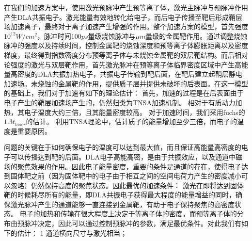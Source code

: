 在我们的加速方案中，使用激光预脉冲产生预等离子体，激光主脉冲与预脉冲作用产生DLA共振电子。激光能量有效地转化给电子，而后电子传播至靶后形成鞘层场加速离子，最终对于离子加速产生增强的作用。整个加速方案的模型，首先强度$10^{12}W/cm^2$，脉冲时间$100ps$量级烧蚀脉冲与$\mu m$量级的金属靶作用。通过调整烧蚀脉冲的强度以及持续时间，控制金属靶的烧蚀深度和预等离子体膨胀距离以及密度梯度，最终得到指数密度分布预等离子体与未烧蚀金属靶的双层靶结构。而后相对论强度的激光与双层靶作用，首先激光脉冲在预等离子体临界密度区域中产生高能量高密度的DLA共振加热电子，共振电子传输到靶后面，在靶后建立起鞘层静电加速场。未烧蚀的金属靶的作用，提供质子层并提供未破坏的后表面。在这一模型的基础上，我们对于加速有如下的理论估计：
首先，加速的过程是在后表面由于电子产生的鞘层加速场产生的，仍然归类为TNSA加速机制。
相对于有质动力加热，其电子温度大约三倍，且其能量密度较高。
对于加速时间，我们采用fuchs的 $1.3 t_{laser}$的估计。 利用TNSA理论中，估计质子的能量增加至少三倍，而电子的温度是重要原因。


问题的关键在于如何确保电子的温度可以达到最大值，而且保证高能量高密度的电子可以传播达到靶的后面。DLA电子高能高密，是由于共振效应，以及通道中磁场的聚焦效果的作用。因此电子能量密度，重要的条件是通道的存在，使得电子达到固体靶之前（因为固体靶中的电子由于相互之间的空间电荷力产生的密度减小可以忽略）仍然保持高度的聚焦状态。因此最优的加速条件：
激光在即将达到固体靶的时候耗尽所有的能量，即DLA共振电子获得最大程度的能量增益的同时，确保激光脉冲产生的通道能够一直连接到金属靶，有助于电子保持聚焦的高密度状态。
电子的加热和传输在很大程度上决定于等离子体的密度，而预等离子体的分布由预脉冲决定，因此可以通过控制预脉冲的参数，满足最优条件。对此我们有如下的估计： 1 通道横向尺寸与激光相当；




